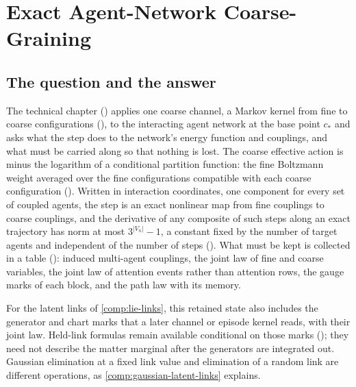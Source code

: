 \chapter{Exact Agent-Network Coarse-Graining}
\label{comp:ch11}

\section{The question and the answer}
\label{comp:ch11-question}

The technical chapter () applies one coarse channel, a Markov kernel from
fine to coarse configurations (), to the interacting agent network at the
base point $c_*$ and asks what the step does to the network's energy function and couplings, and
what must be carried along so that nothing is lost. The coarse effective action is minus the
logarithm of a conditional partition function: the fine Boltzmann weight averaged over the fine
configurations compatible with each coarse configuration (). Written in
interaction coordinates, one component for every set of coupled agents, the step is an exact
nonlinear map from fine couplings to coarse couplings, and the derivative of any composite of such
steps along an exact trajectory has norm at most $3^{\lvert V_n\rvert}-1$, a constant fixed by the number of target agents and
independent of the number of steps (). What must be
kept is collected in a table (): induced multi-agent couplings, the joint
law of fine and coarse variables, the joint law of attention events rather than attention rows, the
gauge marks of each block, and the path law with its memory.

For the latent links of \cref{comp:lie-links}, this retained state also includes the generator and
chart marks that a later channel or episode kernel reads, with their joint law. Held-link formulas
remain available conditional on those marks (); they need not
describe the matter marginal after the generators are integrated out. Gaussian elimination at a
fixed link value and elimination of a random link are different operations, as
\cref{comp:gaussian-latent-links} explains.

